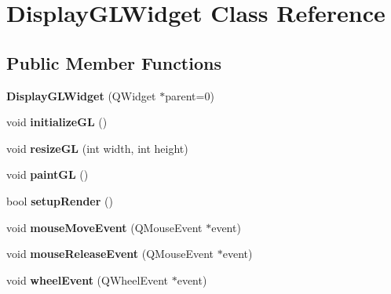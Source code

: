 \hypertarget{class_display_g_l_widget}{\section{\-Display\-G\-L\-Widget \-Class \-Reference}
\label{class_display_g_l_widget}
}
\subsection*{\-Public \-Member \-Functions}
\begin{DoxyCompactItemize}
\item 
\hypertarget{class_display_g_l_widget_afd4466782c9e58f83d136ca2a8d2bc58}{{\bfseries \-Display\-G\-L\-Widget} (\-Q\-Widget $\ast$parent=0)}\label{class_display_g_l_widget_afd4466782c9e58f83d136ca2a8d2bc58}

\item 
\hypertarget{class_display_g_l_widget_a3048807cf76a4e49261cc15bb3d101d5}{void {\bfseries initialize\-G\-L} ()}\label{class_display_g_l_widget_a3048807cf76a4e49261cc15bb3d101d5}

\item 
\hypertarget{class_display_g_l_widget_a7299eaa1d6e07d7675206285fa28c38e}{void {\bfseries resize\-G\-L} (int width, int height)}\label{class_display_g_l_widget_a7299eaa1d6e07d7675206285fa28c38e}

\item 
\hypertarget{class_display_g_l_widget_ae939709e9553e68025fdf7c3926127fd}{void {\bfseries paint\-G\-L} ()}\label{class_display_g_l_widget_ae939709e9553e68025fdf7c3926127fd}

\item 
\hypertarget{class_display_g_l_widget_a94ae573074dfef0f0420738d3c559f5a}{bool {\bfseries setup\-Render} ()}\label{class_display_g_l_widget_a94ae573074dfef0f0420738d3c559f5a}

\item 
\hypertarget{class_display_g_l_widget_acd90ae4536570daf0579106db86d8188}{void {\bfseries mouse\-Move\-Event} (\-Q\-Mouse\-Event $\ast$event)}\label{class_display_g_l_widget_acd90ae4536570daf0579106db86d8188}

\item 
\hypertarget{class_display_g_l_widget_ab7faddcfb841dad1eb089e2d9ef474e9}{void {\bfseries mouse\-Release\-Event} (\-Q\-Mouse\-Event $\ast$event)}\label{class_display_g_l_widget_ab7faddcfb841dad1eb089e2d9ef474e9}

\item 
\hypertarget{class_display_g_l_widget_a7623868e1dd2e9444c2130c0e6772110}{void {\bfseries wheel\-Event} (\-Q\-Wheel\-Event $\ast$event)}\label{class_display_g_l_widget_a7623868e1dd2e9444c2130c0e6772110}


\end{DoxyCompactItemize}
